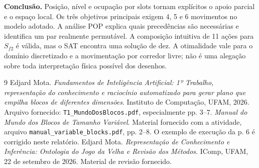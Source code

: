 \documentclass[11pt,a4paper]{article}
\begin{document}
\textbf{Conclusão.} Posição, nível e ocupação por slots tornam explícitos o apoio parcial e o espaço local. Os três objetivos principais exigem 4, 5 e 6 movimentos no modelo adotado. A análise POP explica quais precedências são necessárias e identifica um par realmente permutável. A composição intuitiva de 11 ações para $S_{f2}$ é válida, mas o SAT encontra uma solução de dez. A otimalidade vale para o domínio discretizado e a movimentação por corredor livre; não é uma alegação sobre toda interpretação física possível dos desenhos.

\begin{thebibliography}{9}
 Edjard Mota. \emph{Fundamentos de Inteligência Artificial: 1º Trabalho, representação do conhecimento e raciocínio automatizado para gerar plano que empilha blocos de diferentes dimensões}. Instituto de Computação, UFAM, 2026. Arquivo fornecido: \texttt{T1\_MundoDosBlocos.pdf}, especialmente pp. 3--7.
 \emph{Manual do Mundo dos Blocos de Tamanho Variável}. Material fornecido com a atividade, arquivo \texttt{manual\_variable\_blocks.pdf}, pp. 2--8. O exemplo de execução da p. 6 é corrigido neste relatório.
 Edjard Mota. \emph{Representação de Conhecimento e Inferência: Ontologia do Jogo da Velha e Revisão dos Métodos}. IComp, UFAM, 22 de setembro de 2026. Material de revisão fornecido.
\end{thebibliography}
\end{document}
